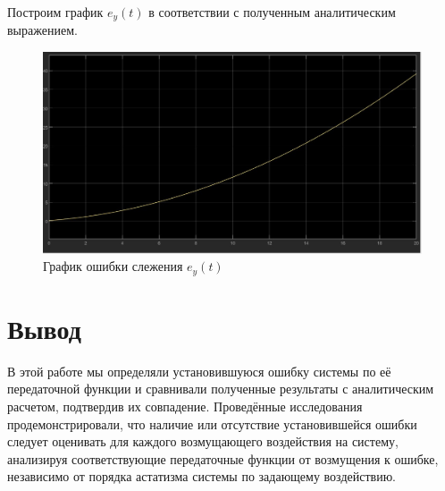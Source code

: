 \documentclass[a4paper, 12pt]{article}
\begin{document}
    \noindent Построим график $e_y(t)$ в соответствии с полученным аналитическим выражением.
    \begin{figure}[H]
        \centering
        \includegraphics[scale=0.3]{task_4_2.jpg}
        \captionsetup{skip=0pt}
        \caption{График ошибки слежения $e_y(t)$}
        \label{fig:task_4_2}
    \end{figure}


    \section{Вывод}
    В этой работе мы определяли установившуюся ошибку системы
    по её передаточной функции и сравнивали полученные результаты
    с аналитическим расчетом, подтвердив их совпадение.
    Проведённые исследования продемонстрировали,
    что наличие или отсутствие установившейся ошибки
    следует оценивать для каждого возмущающего воздействия
    на систему, анализируя соответствующие передаточные
    функции от возмущения к ошибке, независимо от порядка
    астатизма системы по задающему воздействию.
\end{document}
